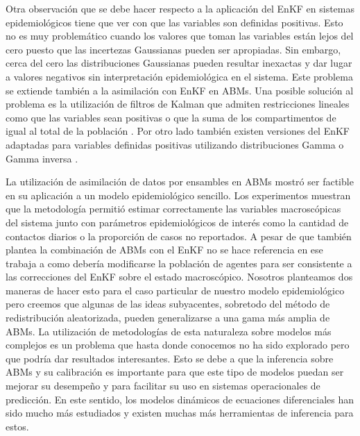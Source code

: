 Otra observación que se debe hacer respecto a la aplicación del EnKF en sistemas epidemiológicos tiene que ver con que las variables son definidas positivas. Esto no es muy problemático cuando los valores que toman las variables están lejos del cero puesto que las incertezas Gaussianas pueden ser apropiadas. Sin embargo, cerca del cero las distribuciones Gaussianas pueden resultar inexactas y dar lugar a valores negativos sin interpretación epidemiológica en el sistema. Este problema se extiende también a la asimilación con EnKF en ABMs. Una posible solución al problema es la utilización de filtros de Kalman que admiten restricciones lineales como que las variables sean positivas o que la suma de los compartimentos de igual al total de la población \citep{Gupta2007}. Por otro lado también existen versiones del EnKF adaptadas para variables definidas positivas utilizando distribuciones Gamma o Gamma inversa \citep{Bishop2016}.

La utilización de asimilación de datos por ensambles en ABMs mostró ser factible en su aplicación a un modelo epidemiológico sencillo. Los experimentos muestran que la metodología permitió estimar correctamente las variables macroscópicas del sistema junto con parámetros epidemiológicos de interés como la cantidad de contactos diarios o la proporción de casos no reportados. A pesar de que \cite{Ward2016} también plantea la combinación de ABMs con el EnKF no se hace referencia en ese trabaja a como debería modificarse la población de agentes para ser consistente a las correcciones del EnKF sobre el estado macroscópico. Nosotros planteamos dos maneras de hacer esto para el caso particular de nuestro modelo epidemiológico pero creemos que algunas de las ideas subyacentes, sobretodo del método de redistribución aleatorizada, pueden generalizarse a una gama más amplia de ABMs. La utilización de metodologías de esta naturaleza sobre modelos más complejos es un problema que hasta donde conocemos no ha sido explorado pero que podría dar resultados interesantes. Esto se debe a que la inferencia sobre ABMs y su calibración es importante para que este tipo de modelos puedan ser mejorar su desempeño y para facilitar su uso en sistemas operacionales de predicción. En este sentido, los modelos dinámicos de ecuaciones diferenciales han sido mucho más estudiados y existen muchas más herramientas de inferencia para estos.

